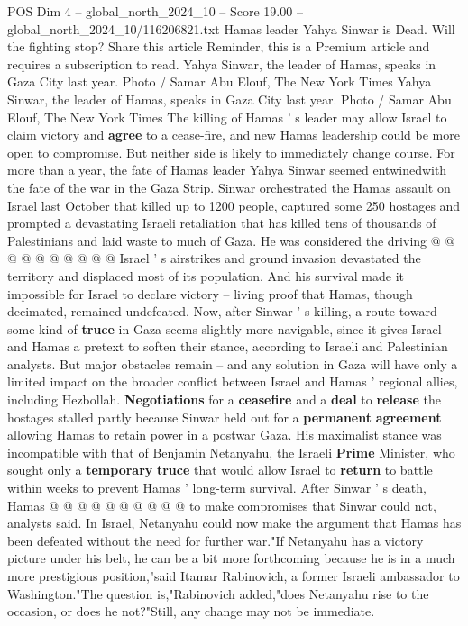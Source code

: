 \begin{textsample}{POS Dim 4 – global\_north\_2024\_10 – Score 19.00 – global\_north\_2024\_10/116206821.txt}  \label{ex:f4_pos_404}
Hamas leader Yahya Sinwar is Dead.
Will the fighting stop?
Share this article Reminder, this is a Premium article and requires a subscription to read.
Yahya Sinwar, the leader of Hamas, speaks in Gaza City last year.
Photo / Samar Abu Elouf, The New York Times Yahya Sinwar, the leader of Hamas, speaks in Gaza City last year.
Photo / Samar Abu Elouf, The New York Times The killing of Hamas ' s leader may allow Israel to claim victory and \textbf{agree} to a cease-fire, and new Hamas leadership could be more open to compromise.
But neither side is likely to immediately change course.
For more than a year, the fate of Hamas leader Yahya Sinwar seemed entwinedwith the fate of the war in the Gaza Strip.
Sinwar orchestrated the Hamas assault on Israel last October that killed up to 1200 people, captured some 250 hostages and prompted a devastating Israeli retaliation that has killed tens of thousands of Palestinians and laid waste to much of Gaza.
He was considered the driving @ @ @ @ @ @ @ @ @ @ Israel ' s airstrikes and ground invasion devastated the territory and displaced most of its population.
And his survival made it impossible for Israel to declare victory -- living proof that Hamas, though decimated, remained undefeated.
Now, after Sinwar ' s killing, a route toward some kind of \textbf{truce} in Gaza seems slightly more navigable, since it gives Israel and Hamas a pretext to soften their stance, according to Israeli and Palestinian analysts.
But major obstacles remain -- and any solution in Gaza will have only a limited impact on the broader conflict between Israel and Hamas ' regional allies, including Hezbollah. \textbf{Negotiations} for a \textbf{ceasefire} and a \textbf{deal} to \textbf{release} the hostages stalled partly because Sinwar held out for a \textbf{permanent} \textbf{agreement} allowing Hamas to retain power in a postwar Gaza.
His maximalist stance was incompatible with that of Benjamin Netanyahu, the Israeli \textbf{Prime} Minister, who sought only a \textbf{temporary} \textbf{truce} that would allow Israel to \textbf{return} to battle within weeks to prevent Hamas ' long-term survival.
After Sinwar ' s death, Hamas @ @ @ @ @ @ @ @ @ @ to make compromises that Sinwar could not, analysts said.
In Israel, Netanyahu could now make the argument that Hamas has been defeated without the need for further war."If Netanyahu has a victory picture under his belt, he can be a bit more forthcoming because he is in a much more prestigious position,"said Itamar Rabinovich, a former Israeli ambassador to Washington."The question is,"Rabinovich added,"does Netanyahu rise to the occasion, or does he not?"Still, any change may not be immediate.

\end{textsample}
